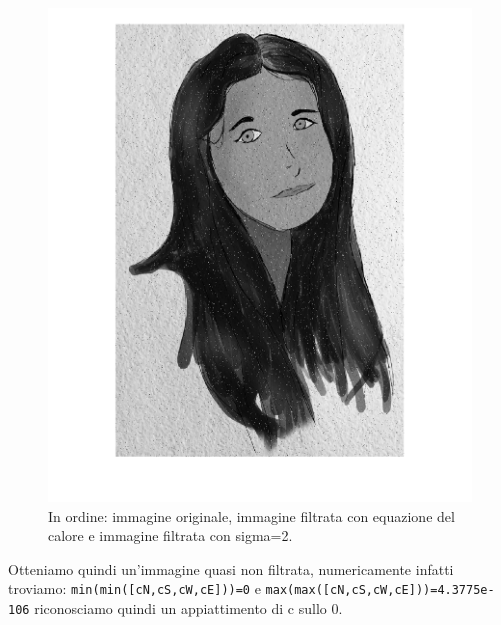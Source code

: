\begin{figure}[htb]
\includegraphics[scale=0.15,trim={3cm 0cm 3cm 0cm},clip]{Pictures/Esempi di utilizzo/Esempio 5/ami_filtrata_sigma2_deltat0_2_resize.png}
\caption{In ordine: immagine originale, immagine filtrata con equazione del calore e immagine filtrata con sigma=2.}\label{fig:figura}
\end{figure} 
Otteniamo quindi un'immagine quasi non filtrata, numericamente infatti troviamo:
\texttt{min(min([cN,cS,cW,cE]))=0} e \texttt{max(max([cN,cS,cW,cE]))=4.3775e-106}
riconosciamo quindi un appiattimento di c sullo 0.